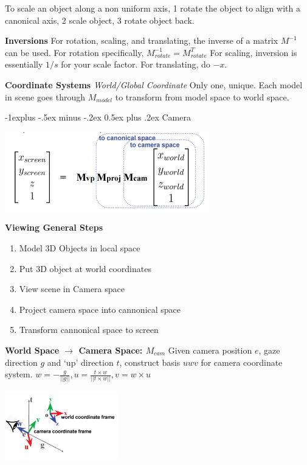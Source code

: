 \documentclass[letterpaper, 8pt]{extarticle}
\makeatletter
\renewcommand{\section}{\@startsection{section}{1}{0mm}%
                                {-1explus -.5ex minus -.2ex}%
                                {0.5ex plus .2ex}%
                                {\normalfont\normalsize\bfseries}}
\makeatother
\begin{document}
\begin{multicols*}{4}
To scale an object along a non uniform axis, 1 rotate the object to align with a canonical axis, 2 scale object, 3 rotate object back.

\textbf{Inversions}
For rotation, scaling, and translating,
the inverse of a matrix \(M^{-1}\) can be used.
For rotation specifically, \(M^{-1}_{rotate}=M^T_{rotate}\)
For scaling, inversion is essentially \(1/s\) for your scale factor.
For translating, do \(-x\).

\textbf{Coordinate Systems}
\textit{World/Global Coordinate}
Only one, unique.
Each model in scene goes through \(M_{model}\) to transform from model space to world space.

\section{Camera}

\includegraphics[width=\linewidth]{cam-total.png}

\textbf{Viewing General Steps}
\begin{enumerate}
    \item Model 3D Objects in local space
    \item Put 3D object at world coordinates
    \item View scene in Camera space
    \item Project camera space into cannonical space
    \item Transform cannonical space to screen
\end{enumerate}

\textbf{World Space $\to$ Camera Space: $M_{cam}$}
Given camera position $e$, gaze direction $g$ and `up' direction $t$, construct basis $uwv$ for camera coordinate system.
$w = - \frac{g}{||g||}, u = \frac{t \times w}{||t \times w||}, v = w \times u$ 

\includegraphics[height=3cm]{camera-basis.png}


\end{multicols*}
\end{document}
